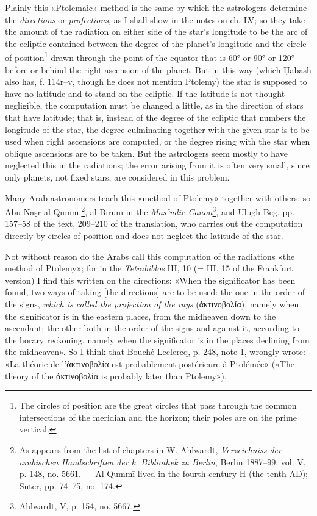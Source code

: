 \documentclass[11pt]{article}
\newcommand{\Pg}[1]{\marginpar{\footnotesize\color{gray}#1}}
\begin{document}
\par \Pg{I 312}Plainly this «Ptolemaic» method is the same by which the astrologers determine the \emph{directions} or \emph{profections}, as I shall show in the notes on ch. LV; so they take the amount of the radiation on either side of the star's longitude to be the arc of the ecliptic contained between the degree of the planet's longitude and the circle of position\footnote{The circles of position are the great circles that pass through the common intersections of the meridian and the horizon; their poles are on the prime vertical.} drawn through the point of the equator that is 60° or 90° or 120° before or behind the right ascension of the planet. But in this way (which Ḥabash also has, f. 114r–v, though he does not mention Ptolemy) the star is supposed to have no latitude and to stand on the ecliptic. If the latitude is not thought negligible, the computation must be changed a little, as in the direction of stars that have latitude; that is, instead of the degree of the ecliptic that numbers the longitude of the star, the degree culminating together with the given star is to be used when right ascensions are computed, or the degree rising with the star when oblique ascensions are to be taken. But the astrologers seem mostly to have neglected this in the radiations; the error arising from it is often very small, since only planets, not fixed stars, are considered in this problem.\par
\par Many Arab astronomers teach this «method of Ptolemy» together with others: so Abū Naṣr al-Qummī\footnote{As appears from the list of chapters in W. Ahlwardt, \emph{Verzeichniss der arabischen Handschriften der k. Bibliothek zu Berlin}, Berlin 1887–99, vol. V, p. 148, no. 5661. — Al-Qummī lived in the fourth century H (the tenth AD); Suter, pp. 74–75, no. 174.}, al-Bīrūnī in the \emph{Masʿūdic Canon}\footnote{Ahlwardt, V, p. 154, no. 5667.}, and Ulugh Beg, pp. 157–58 of the text, 209–210 of the translation, who carries out the computation directly by circles of position and does not neglect the latitude of the star.\par
\par Not without reason do the Arabs call this computation of the radiations «the method of Ptolemy»; for in the \emph{Tetrabiblos} III, 10 (= III, 15 of the Frankfurt version) I find this written on the directions: «When the significator has been found, two ways of taking [the directions] are to be used: the one in the order of the signs, \emph{which is called the projection of the rays} ({\greekfont ἀκτινοβολία}), namely when the significator is in the eastern places, from the midheaven down to the ascendant; the other both in the order of the signs and against it, according to the horary reckoning, namely when the significator is in the places declining from the midheaven». So I think that Bouché-Leclercq, p. 248, note 1, wrongly wrote: «La théorie de l’{\greekfont ἀκτινοβολία} est probablement postérieure à Ptolémée» («The theory of the {\greekfont ἀκτινοβολία} is probably later than Ptolemy»).\par
\end{document}
